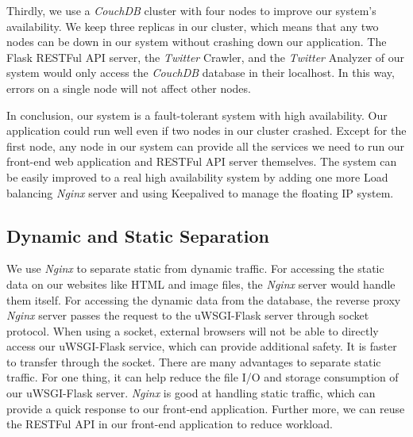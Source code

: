 \documentclass{article}
\begin{document}
Thirdly, we use a \textit{CouchDB} cluster with four nodes to improve our system's availability. We keep three replicas in our cluster, which means that any two nodes can be down in our system without crashing down our application. The Flask RESTFul API server, the \textit{Twitter} Crawler, and the \textit{Twitter} Analyzer of our system would only access the \textit{CouchDB} database in their localhost. In this way, errors on a single node will not affect other nodes. 

In conclusion, our system is a fault-tolerant system with high availability. Our application could run well even if two nodes in our cluster crashed. Except for the first node, any node in our system can provide all the services we need to run our front-end web application and RESTFul API server themselves. The system can be easily improved to a real high availability system by adding one more Load balancing \textit{Nginx} server and using Keepalived to manage the floating IP system.

\subsection{Dynamic and Static Separation}
We use \textit{Nginx} to separate static from dynamic traffic. For accessing the static data on our websites like HTML and image files, the \textit{Nginx} server would handle them itself. For accessing the dynamic data from the database, the reverse proxy \textit{Nginx} server passes the request to the uWSGI-Flask server through socket protocol. When using a socket, external browsers will not be able to directly access our uWSGI-Flask service, which can provide additional safety. It is faster to transfer through the socket. There are many advantages to separate static traffic. For one thing, it can help reduce the file I/O and storage consumption of our uWSGI-Flask server. \textit{Nginx} is good at handling static traffic, which can provide a quick response to our front-end application. Further more, we can reuse the RESTFul API in our front-end application to reduce workload.






\end{document}

